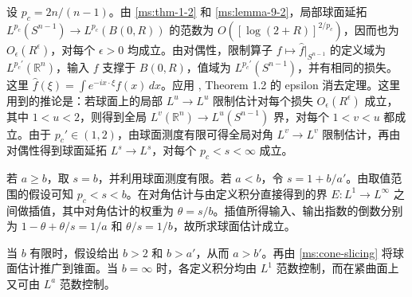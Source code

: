 设 \(p_c=2n/(n-1)\)。由 \ref{ms:thm-1-2} 和 \ref{ms:lemma-9-2}，局部球面延拓 \(L^{p_c}(S^{n-1})\to L^{p_c}(B(0,R))\) 的范数为 \(O([\log(2+R)]^{2/p_c})\)，因而也为 \(O_\epsilon(R^\epsilon)\)，对每个 \(\epsilon>0\) 均成立。由对偶性，限制算子 \(f\mapsto\widehat f|_{S^{n-1}}\) 的定义域为 \(L^{p_c'}(\mathbb R^n)\)，输入 \(f\) 支撑于 \(B(0,R)\)，值域为 \(L^{p_c'}(S^{n-1})\)，并有相同的损失。这里 \(\widehat f(\xi)=\int e^{-ix\cdot\xi}f(x)\,dx\)。应用 \cite{r-75}, Theorem 1.2 的 epsilon 消去定理。这里用到的推论是：若球面上的局部 \(L^u\to L^u\) 限制估计对每个损失 \(O_\epsilon(R^\epsilon)\) 成立，其中 \(1<u<2\)，则得到全局 \(L^v(\mathbb R^n)\to L^u(S^{n-1})\) 界，对每个 \(1<v<u\) 都成立。由于 \(p_c'\in(1,2)\)，由球面测度有限可得全局对角 \(L^v\to L^v\) 限制估计，再由对偶性得到球面延拓 \(L^s\to L^s\)，对每个 \(p_c<s<\infty\) 成立。

若 \(a\ge b\)，取 \(s=b\)，并利用球面测度有限。若 \(a<b\)，令 \(s=1+b/a'\)。由取值范围的假设可知 \(p_c<s<b\)。在对角估计与由定义积分直接得到的界 \(E:L^1\to L^\infty\) 之间做插值，其中对角估计的权重为 \(\theta=s/b\)。插值所得输入、输出指数的倒数分别为 \(1-\theta+\theta/s=1/a\) 和 \(\theta/s=1/b\)，故所求球面估计成立。

当 \(b\) 有限时，假设给出 \(b>2\) 和 \(b>a'\)，从而 \(a>b'\)。再由 \ref{ms:cone-slicing} 将球面估计推广到锥面。当 \(b=\infty\) 时，各定义积分均由 \(L^1\) 范数控制，而在紧曲面上又可由 \(L^a\) 范数控制。

